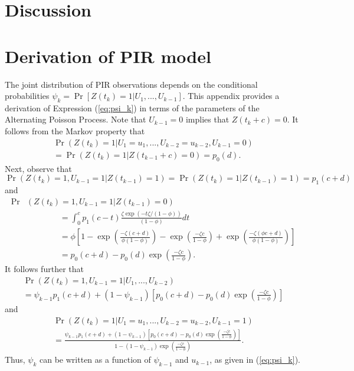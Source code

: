 \documentclass[man, noextraspace, floatsintext]{apa6}\usepackage[]{graphicx}\usepackage[]{color}
\newcommand{\bibfile}{C:/Users/jep2963/Documents/Bibliography/Behavioral_observation-APP}
\begin{document}
\section{Discussion}
\label{sec:discussion}



 
\appendix

\section{Derivation of PIR model}
\label{app:PIR_derivation}

The joint distribution of PIR observations depends on the conditional probabilities $\psi_k = \Pr\left[ Z(t_k) = 1 \left| U_1,...,U_{k-1}\right.\right]$. This appendix provides a derivation of Expression (\ref{eq:psi_k}) in terms of the parameters of the Alternating Poisson Process. Note that $U_{k-1} = 0$ implies that $Z(t_k + c) = 0$. It follows from the Markov property that 
\begin{multline*}
\Pr\left(Z(t_k) = 1 \left| U_1 = u_1,...,U_{k-2} = u_{k-2}, U_{k-1} = 0 \right.\right) \\ 
= \Pr\left(Z(t_k) = 1 \left| Z(t_{k-1} + c) = 0 \right.\right) = p_0(d).
\end{multline*}
Next, observe that \[
\Pr\left(Z(t_k) = 1, U_{k-1} = 1 \left| Z(t_{k-1}) = 1 \right.\right) = \Pr\left(Z(t_k) = 1 \left| Z(t_{k-1}) = 1 \right.\right) = p_1(c + d) \]
and \begin{align*}
\Pr &\left(Z(t_k) = 1, U_{k-1} = 1 \left| Z(t_{k-1}) = 0 \right.\right) \\
& \qquad \qquad = \int_0^c p_1(c - t) \frac{ \zeta \exp(-t \zeta / (1 - \phi))}{(1 - \phi)} dt \\
& \qquad \qquad  = \phi \left[ 1 - \exp\left(\frac{- \zeta (c + d)}{\phi(1 - \phi)}\right) - \exp\left(\frac{- \zeta c}{1 - \phi}\right) + \exp\left(\frac{- \zeta (\phi c + d)}{\phi(1 - \phi)}\right)\right] \\
& \qquad \qquad = p_0(c + d) - p_0(d) \exp\left(\frac{- \zeta c}{1 - \phi}\right).
\end{align*}
It follows further that \begin{multline*}
\Pr\left(Z(t_k) = 1, U_{k-1} = 1 \left| U_1,...,U_{k-2} \right.\right) \\
= \psi_{k-1} p_1(c + d) + (1 - \psi_{k-1}) \left[p_0(c + d) - p_0(d) \exp\left(\frac{- \zeta c}{1 - \phi}\right)\right]
\end{multline*}
and
\begin{multline*}
\Pr\left(Z(t_k) = 1 \left| U_1 = u_1,...,U_{k-2} = u_{k-2}, U_{k-1} = 1 \right.\right) \\
= \frac{\psi_{k-1} p_1(c + d) + (1 - \psi_{k-1}) \left[p_0(c + d) - p_0(d) \exp\left(\frac{- \zeta c}{1 - \phi}\right)\right]}{1 - (1 - \psi_{k-1})\exp\left( \frac{-\zeta c}{1 - \phi}\right)}.
\end{multline*}
Thus, $\psi_k$ can be written as a function of $\psi_{k-1}$ and $u_{k-1}$, as given in (\ref{eq:psi_k}).
\end{document}
